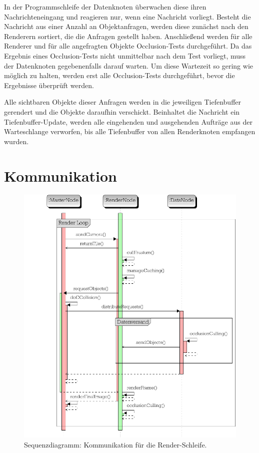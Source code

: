 In der Programmschleife der Datenknoten überwachen diese ihren Nachrichteneingang und reagieren nur, wenn eine Nachricht vorliegt. Besteht die Nachricht aus einer Anzahl an Objektanfragen, werden diese zunächst nach den Renderern sortiert, die die Anfragen gestellt haben. Anschließend werden für alle Renderer und für alle angefragten Objekte Occlusion-Tests durchgeführt. Da das Ergebnis eines Occlusion-Tests nicht unmittelbar nach dem Test vorliegt, muss der Datenknoten gegebenenfalls darauf warten. Um diese Wartezeit so gering wie möglich zu halten, werden erst alle Occlusion-Tests durchgeführt, bevor die Ergebnisse überprüft werden. 

Alle sichtbaren Objekte dieser Anfragen werden in die jeweiligen Tiefenbuffer gerendert und die Objekte daraufhin verschickt. Beinhaltet die Nachricht ein Tiefenbuffer-Update, werden alle eingehenden und ausgehenden Aufträge aus der Warteschlange verworfen, bis alle Tiefenbuffer von allen Renderknoten empfangen wurden.

\section{Kommunikation}
\label{sec:impl:kommunikation}
\begin{figure}
\centering
\includegraphics[width=\hsize]{images/seq_diag_render.pdf}
  \caption{\label{fig:impl:seqdiagrender}Sequenzdiagramm: Kommunikation für die Render-Schleife.}
\end{figure}

